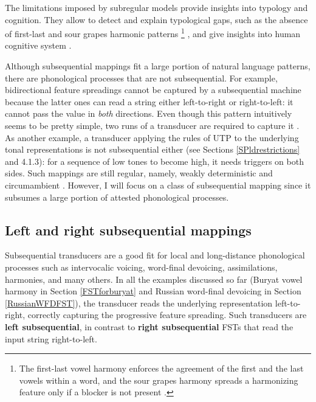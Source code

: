 The limitations imposed by subregular models provide insights into typology and cognition.
They allow to detect and explain typological gaps, such as the absence of first-last and sour grapes harmonic patterns%
\footnote{The first-last vowel harmony enforces the agreement of the first and the last vowels within a word, and the sour grapes harmony spreads a harmonizing feature only if a blocker is not present \citep{Heinz-Lai-2013-VHS}.}
 \citep{Heinz-Lai-2013-VHS,Luo2017}, and give insights into human cognitive system \citep{RogersPullum2011,Lai15,Avcu2018}.


Although subsequential mappings fit a large portion of natural language patterns, there are phonological processes that are not subsequential.
For example, bidirectional feature spreadings cannot be captured by a subsequential machine because the latter ones can read a string either left-to-right or right-to-left: it cannot pass the value in \emph{both} directions.
Even though this pattern intuitively seems to be pretty simple, two runs of a transducer are required to capture it \citep{Heinz-Lai-2013-VHS}.
As another example, a transducer applying the rules of UTP to the underlying tonal representations is not subsequential either (see Sections \ref{SPldrestrictions} and 4.1.3): for a sequence of low tones to become high, it needs triggers on both sides.
Such mappings are still regular, namely, weakly deterministic and circumambient \citep{Heinz-Lai-2013-VHS,Jardine2016,LamontEtAl2019}.
However, I will focus on a class of subsequential mapping since it subsumes a large portion of attested phonological processes.





\subsection{Left and right subsequential mappings}


Subsequential transducers are a good fit for local and long-distance phonological processes such as intervocalic voicing, word-final devoicing, assimilations, harmonies, and many others.
In all the examples discussed so far (Buryat vowel harmony in Section \ref{FSTforburyat} and Russian word-final devoicing in Section \ref{RussianWFDFST}), the transducer reads the underlying representation left-to-right, correctly capturing the progressive feature spreading.
Such transducers are \textbf{left subsequential}, in contrast to \textbf{right subsequential} FSTs that read the input string right-to-left.


